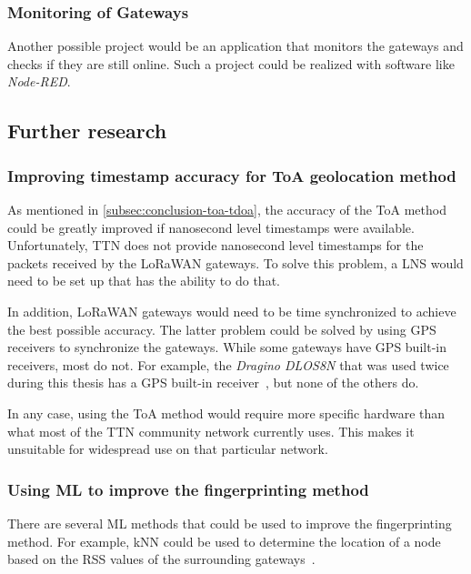 \subsubsection{Monitoring of Gateways}

Another possible project would be an application that monitors the gateways and checks if they are still online.
Such a project could be realized with software like \emph{Node-RED}.~\cite{openjs_foundation_node-red_nodate}

\subsection{Further research}

\subsubsection{Improving timestamp accuracy for \acf{ToA} geolocation method}

As mentioned in \cref{subsec:conclusion-toa-tdoa}, the accuracy of the \ac{ToA} method could be greatly improved if nanosecond level timestamps were available.
Unfortunately, \ac{TTN} does not provide nanosecond level timestamps for the packets received by the \ac{LoRaWAN} gateways.
To solve this problem, a \ac{LNS} would need to be set up that has the ability to do that.

In addition, \ac{LoRaWAN} gateways would need to be time synchronized to achieve the best possible accuracy.
The latter problem could be solved by using \ac{GPS} receivers to synchronize the gateways.
While some gateways have \ac{GPS} built-in receivers, most do not.
For example, the \emph{Dragino DLOS8N} that was used twice during this thesis has a \ac{GPS} built-in receiver~\cite{dragino_technology_co_ltd_dlos8n_2023}, but none of the others do.

In any case, using the \ac{ToA} method would require more specific hardware than what most of the \ac{TTN} community network currently uses.
This makes it unsuitable for widespread use on that particular network.

\subsubsection{Using \acf{ML} to improve the fingerprinting method}

There are several \ac{ML} methods that could be used to improve the fingerprinting method.
For example, \ac{kNN} could be used to determine the location of a node based on the \ac{RSS} values of the surrounding gateways~\cite{anagnostopoulos_reproducible_2019}.

